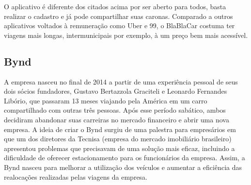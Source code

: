 O aplicativo é diferente dos citados acima por ser aberto para todos, basta realizar o cadastro e já pode compartilhar suas caronas. Comparado a outros aplicativos voltados à remuneração como Uber e 99, o BlaBlaCar costuma ter viagens mais longas, intermunicipais por exemplo, à um preço bem mais acessível. %


\subsection{Bynd}

A empresa nasceu no final de 2014 a partir de uma experiência pessoal de seus dois sócios fundadores, Gustavo Bertazzola Graciteli e Leonardo Fernandes Libório, que passaram 13 meses viajando pela América em um carro compartilhado com outras três pessoas. Após esse período sabático, ambos decidiram abandonar suas carreiras no mercado financeiro e abrir uma nova empresa. A ideia de criar o Bynd surgiu de uma palestra para empresários em que um dos diretores da Tecnisa (empresa do mercado imobiliário brasileiro) apresentou problemas que precisavam de uma solução mais eficaz, incluindo a dificuldade de oferecer estacionamento para os funcionários da empresa. Assim, a Bynd nasceu para melhorar a utilização dos veículos e aumentar a eficiência das realocações realizadas pelas viagens da empresa.

